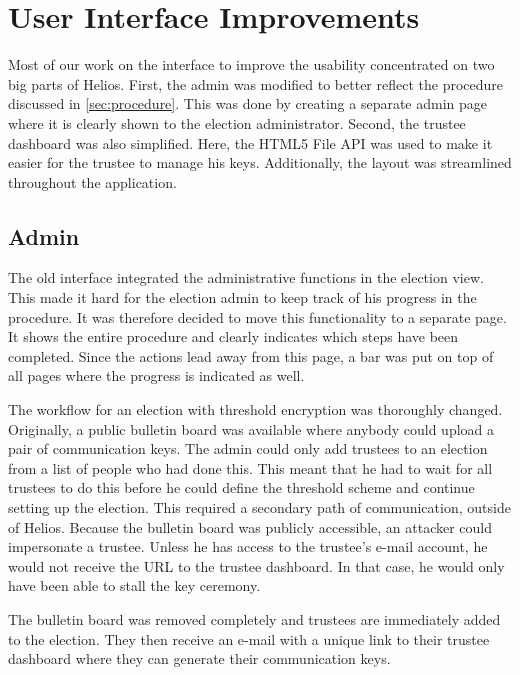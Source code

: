 % 
%

\section{User Interface Improvements}
\label{sec:user_interface_improvements}

Most of our work on the interface to improve the usability concentrated on two big parts of Helios. First, the admin was modified to better reflect the procedure discussed in \ref{sec:procedure}. This was done by creating a separate admin page where it is clearly shown to the election administrator. Second, the trustee dashboard was also simplified. Here, the HTML5 File API was used to make it easier for the trustee to manage his keys. Additionally, the layout was streamlined throughout the application. 

\subsection{Admin}

The old interface integrated the administrative functions in the election view. This made it hard for the election admin to keep track of his progress in the procedure. It was therefore decided to move this functionality to a separate page. It shows the entire procedure and clearly indicates which steps have been completed. Since the actions lead away from this page, a bar was put on top of all pages where the progress is indicated as well.

\par The workflow for an election with threshold encryption was thoroughly changed. Originally, a public bulletin board was available where anybody could upload a pair of communication keys. The admin could only add trustees to an election from a list of people who had done this. This meant that he had to wait for all trustees to do this before he could define the threshold scheme and continue setting up the election. This required a secondary path of communication, outside of Helios. Because the bulletin board was publicly accessible, an attacker could impersonate a trustee. Unless he has access to the trustee's e-mail account, he would not receive the URL to the trustee dashboard. In that case, he would only have been able to stall the key ceremony.

\par The bulletin board was removed completely and trustees are immediately added to the election. They then receive an e-mail with a unique link to their trustee dashboard where they can generate their communication keys.

